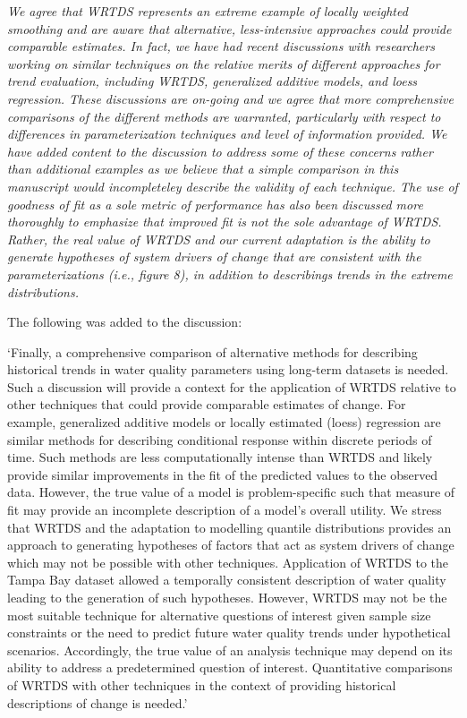 \documentclass[letterpaper,12pt,oneside]{article}\usepackage[]{graphicx}\usepackage[]{color}
\begin{document}
{\it We agree that WRTDS represents an extreme example of locally weighted smoothing and are aware that alternative, less-intensive approaches could provide comparable estimates.  In fact, we have had recent discussions with researchers working on similar techniques on the relative merits of different approaches for trend evaluation, including WRTDS, generalized additive models, and loess regression.  These discussions are on-going and we agree that more comprehensive comparisons of the different methods are warranted, particularly with respect to differences in parameterization techniques and level of information provided.  We have added content to the discussion to address some of these concerns rather than additional examples as we believe that a simple comparison in this manuscript would incompleteley describe the validity of each technique.  The use of goodness of fit as a sole metric of performance has also been discussed more thoroughly to emphasize that improved fit is not the sole advantage of WRTDS.  Rather, the real value of WRTDS and our current adaptation is the ability to generate hypotheses of system drivers of change that are consistent with the parameterizations (i.e., figure 8), in addition to describings trends in the extreme distributions.  

The following was added to the discussion:

`Finally, a comprehensive comparison of alternative methods for describing historical trends in water quality parameters using long-term datasets is needed.  Such a discussion will provide a context for the application of \acs{WRTDS} relative to other techniques that could provide comparable estimates of change.  For example, generalized additive models or locally estimated (loess) regression are similar methods for describing conditional response within discrete periods of time.  Such methods are less computationally intense than \acs{WRTDS} and likely provide similar improvements in the fit of the predicted values to the observed data. However, the true value of a model is problem-specific such that measure of fit may provide an incomplete description of a model's overall utility.  We stress that \acs{WRTDS} and the adaptation to modelling quantile distributions provides an approach to generating hypotheses of factors that act as system drivers of change which may not be possible with other techniques.  Application of \acs{WRTDS} to the Tampa Bay dataset allowed a temporally consistent description of water quality leading to the generation of such hypotheses.  However, \acs{WRTDS} may not be the most suitable technique for alternative questions of interest given sample size constraints or the need to predict future water quality trends under hypothetical scenarios.  Accordingly, the true value of an analysis technique may depend on its ability to address a predetermined question of interest.  Quantitative comparisons of \acs{WRTDS} with other techniques in the context of providing historical descriptions of change is needed.'

}
\end{document}
